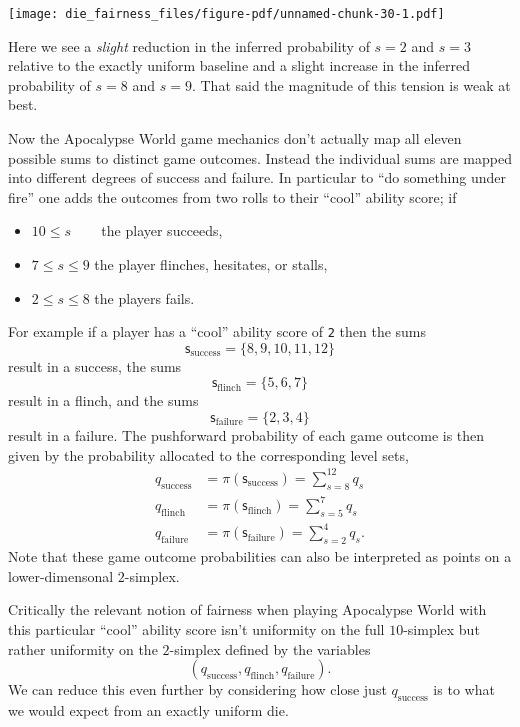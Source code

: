 \documentclass[
  letterpaper,
  DIV=11,
  numbers=noendperiod]{scrartcl}
\providecommand{\tightlist}{%
  \setlength{\itemsep}{0pt}\setlength{\parskip}{0pt}}\usepackage{longtable,booktabs,array}
\begin{document}
\texttt{[image: die\_fairness\_files/figure-pdf/unnamed-chunk-30-1.pdf]}

Here we see a \emph{slight} reduction in the inferred probability of
\(s = 2\) and \(s = 3\) relative to the exactly uniform baseline and a
slight increase in the inferred probability of \(s = 8\) and \(s = 9\).
That said the magnitude of this tension is weak at best.

Now the Apocalypse World game mechanics don't actually map all eleven
possible sums to distinct game outcomes. Instead the individual sums are
mapped into different degrees of success and failure. In particular to
``do something under fire'' one adds the outcomes from two rolls to
their ``cool'' ability score; if

\begin{itemize}
\tightlist
\item
  \(10 \le s \quad\;\;\;\) the player succeeds,
\item
  \(7  \le s \le 9\) the player flinches, hesitates, or stalls,
\item
  \(2  \le s \le 8\) the players fails.
\end{itemize}

For example if a player has a ``cool'' ability score of \texttt{2} then
the sums \[
\mathsf{s}_{\mathrm{success}} = \{ 8, 9, 10, 11, 12 \}
\] result in a success, the sums \[
\mathsf{s}_{\mathrm{flinch}} = \{ 5, 6, 7 \}
\] result in a flinch, and the sums \[
\mathsf{s}_{\mathrm{failure}} = \{ 2, 3, 4 \}
\] result in a failure. The pushforward probability of each game outcome
is then given by the probability allocated to the corresponding level
sets, \begin{align*}
q_{\mathrm{success}}
&=
\pi( \mathsf{s}_{\mathrm{success}} ) = \sum_{s = 8}^{12} q_{s}
\\
q_{\mathrm{flinch}}
&=
\pi( \mathsf{s}_{\mathrm{flinch}} ) = \sum_{s = 5}^{7} q_{s}
\\
q_{\mathrm{failure}}
&=
\pi( \mathsf{s}_{\mathrm{failure}} ) = \sum_{s = 2}^{4} q_{s}.
\end{align*} Note that these game outcome probabilities can also be
interpreted as points on a lower-dimensonal \(2\)-simplex.

Critically the relevant notion of fairness when playing Apocalypse World
with this particular ``cool'' ability score isn't uniformity on the full
\(10\)-simplex but rather uniformity on the \(2\)-simplex defined by the
variables \[
(q_{\mathrm{success}}, q_{\mathrm{flinch}}, q_{\mathrm{failure}}) .
\] We can reduce this even further by considering how close just
\(q_{\mathrm{success}}\) is to what we would expect from an exactly
uniform die.
\end{document}
